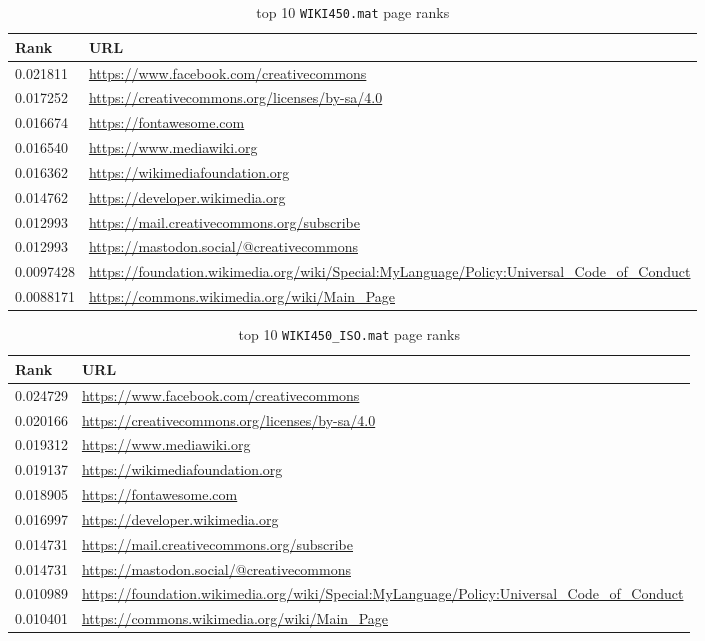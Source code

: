 \documentclass[unicode,11pt,a4paper,oneside,numbers=endperiod,openany]{scrartcl}
\begin{document}
{
\hypersetup{hidelinks}
\begin{table}[htb!]
    \centering
    \begin{tabular}{lp{12cm}}
        \toprule
        \textbf{Rank} & \textbf{URL} \\
        \midrule
        0.021811 & \url{https://www.facebook.com/creativecommons} \\
        0.017252 & \url{https://creativecommons.org/licenses/by-sa/4.0} \\
        0.016674 & \url{https://fontawesome.com} \\
        0.016540 & \url{https://www.mediawiki.org} \\
        0.016362 & \url{https://wikimediafoundation.org} \\
        0.014762 & \url{https://developer.wikimedia.org} \\
        0.012993 & \url{https://mail.creativecommons.org/subscribe} \\
        0.012993 & \url{https://mastodon.social/@creativecommons} \\
        0.0097428 & \url{https://foundation.wikimedia.org/wiki/Special:MyLanguage/Policy:Universal_Code_of_Conduct} \\
        0.0088171 & \url{https://commons.wikimedia.org/wiki/Main_Page} \\
        \bottomrule
    \end{tabular}
    \caption{top 10 \texttt{WIKI450.mat} page ranks}
\end{table}
\begin{table}[htb!]
    \centering
    \begin{tabular}{lp{12cm}}
        \toprule
        \textbf{Rank} & \textbf{URL} \\
        \midrule
        0.024729 & \url{https://www.facebook.com/creativecommons} \\
        0.020166 & \url{https://creativecommons.org/licenses/by-sa/4.0} \\
        0.019312 & \url{https://www.mediawiki.org} \\
        0.019137 & \url{https://wikimediafoundation.org} \\
        0.018905 & \url{https://fontawesome.com} \\
        0.016997 & \url{https://developer.wikimedia.org} \\
        0.014731 & \url{https://mail.creativecommons.org/subscribe} \\
        0.014731 & \url{https://mastodon.social/@creativecommons} \\
        0.010989 & \url{https://foundation.wikimedia.org/wiki/Special:MyLanguage/Policy:Universal_Code_of_Conduct} \\
        0.010401 & \url{https://commons.wikimedia.org/wiki/Main_Page} \\
        \bottomrule
    \end{tabular}
    \caption{top 10 \texttt{WIKI450\_ISO.mat} page ranks}
\end{table}
}
\end{document}
